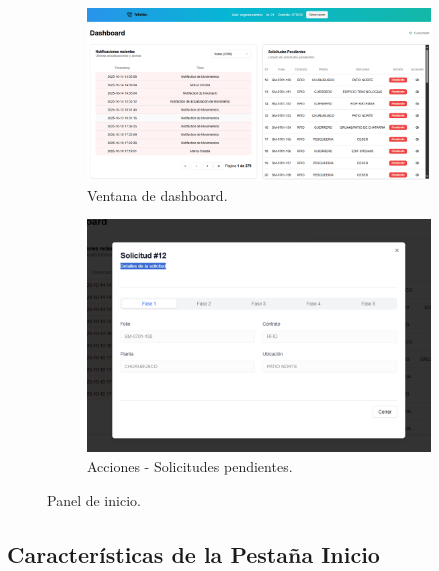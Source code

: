 \begin{figure}[ht!]
\centering
\begin{subfigure}{0.45\textwidth}
    \includegraphics[width=\textwidth]{imgs/Almacen General/Dashboard/almacen_deahboard.png}
    \caption{Ventana de dashboard.}
    \label{fig:dash1}
\end{subfigure}
\hfill
\begin{subfigure}{0.45\textwidth}
    \includegraphics[width=\textwidth]{imgs/Almacen General/Dashboard/almacen_acciones.png}
    \caption{Acciones - Solicitudes pendientes.}
    \label{fig:dash2}
\end{subfigure}        
\caption{Panel de inicio.}
\label{fig:dashboard}
\end{figure}



\subsection{Características de la Pestaña Inicio} 

